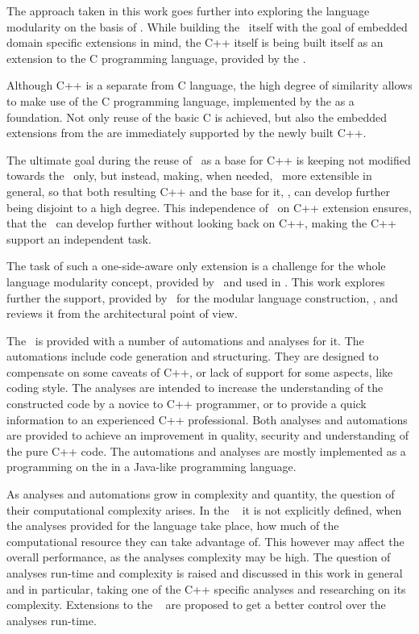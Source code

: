 The approach taken in this work goes further into exploring the language modularity on the basis of \jbmps. While building 
the \cpppl\ itself  with the goal of embedded domain specific extensions in mind, the C++ itself is being built itself as 
an extension to the C programming language, provided by the . 

Although C++ is a separate from C language, the high degree of similarity allows to make use of the C programming language,
implemented by the  as a foundation. Not only reuse of the basic C is achieved, but also the embedded extensions from
the  are immediately supported by the newly built C++.

The ultimate goal during the reuse of \mbdr\ as a base for C++ is keeping 
not modified towards the \cpppl\ only, but instead, making, when needed, \mbeddr\  more extensible in general, 
so that both resulting C++ and the base for it, \mbdr,  can develop further being disjoint to a high degree.
This independence of \mbdr\ on C++ extension ensures, that the \mbdp\ can develop further without looking back 
on C++, making the C++ support an independent task.

The task of such a one-side-aware only extension is a challenge for the whole language modularity concept, 
provided by \jbmps\ and used in \mbdr. This work explores further the support, provided by \jbmps\ for the modular 
language construction, \cite{2012_ratiu_modular_dsls_and_analyses}, and reviews it from the architectural point of view.

The \cpppl\ is provided with a number of automations and analyses for it. The automations include code 
generation and structuring. They are designed to compensate on some caveats of C++, or lack of support for 
some aspects, like coding style. The analyses are intended to increase the understanding of the constructed
code by a novice to C++ programmer, or to provide a quick information to an experienced C++ professional. 
Both analyses and automations are provided to achieve an improvement in quality, security and understanding of 
the pure C++ code. The automations and analyses are mostly implemented as a programming on the  
in a Java-like programming language.

As analyses and automations grow in complexity and quantity, the question of their computational complexity arises.
In the \jbmps\  it is not explicitly defined, when the analyses provided for the language take place, 
how much of the computational resource they can take advantage of. This however may affect the overall  performance, 
as the analyses complexity may be high. The question of analyses run-time and complexity is raised and discussed in 
this work in general and in particular, taking one of the C++ specific analyses and researching on its complexity.
Extensions to the \jbmps\  are proposed to get a better control over the analyses run-time.
